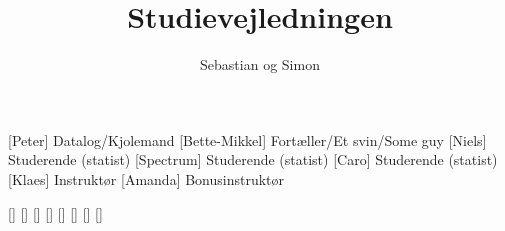 \documentclass[a4paper,11pt]{article}
\title{Studievejledningen}
\author{Sebastian og Simon}
\begin{document}
\maketitle

\begin{roles}
  [Peter] Datalog/Kjolemand
  [Bette-Mikkel] Fortæller/Et svin/Some guy
  [Niels] Studerende (statist)
  [Spectrum] Studerende (statist)
  [Caro] Studerende (statist)
  [Klaes] Instruktør
  [Amanda] Bonusinstruktør
\end{roles}

\begin{props}
  []
  []
  []
  []
  []
  []
  []
  []
\end{props}
\end{document}
